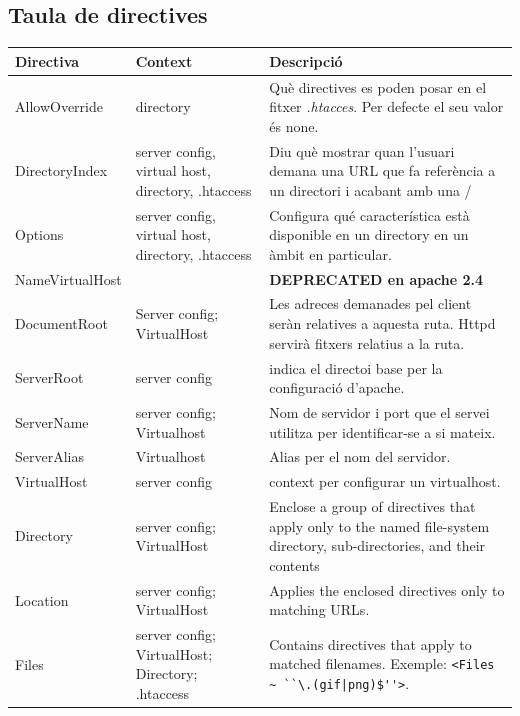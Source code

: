 \documentclass[a4paper, 11pt]{article}
\begin{document}
\subsection{Taula de directives}
\begin{tabular}{|p{4cm}|p{3cm}|p{5cm}|}
\hline
\textbf{Directiva} & \textbf{Context} & \textbf{Descripció} \\
\hline
AllowOverride & directory & Què directives es poden posar en el fitxer \textit{.htacces}. Per defecte el seu valor \'es none.\\
\hline
DirectoryIndex & server config, virtual host, directory, .htaccess & Diu què mostrar quan l'usuari demana una URL que fa referència a un directori i acabant amb una \slash\\
\hline
Options & server config, virtual host, directory, .htaccess & Configura qu\'e característica està disponible en un directory en un àmbit en particular.\\
\hline
NameVirtualHost & & \textbf{DEPRECATED en apache 2.4}\\
\hline
DocumentRoot & Server config; VirtualHost& Les adreces demanades pel client seràn relatives a aquesta ruta. Httpd servirà fitxers relatius a la ruta.\\
\hline
ServerRoot & server config& indica el directoi base per la configuració d'apache.\\
\hline
ServerName & server config; Virtualhost& Nom de servidor i port que el servei utilitza per identificar-se a si mateix.\\
\hline
ServerAlias & Virtualhost& Alias per el nom del servidor.\\
\hline
VirtualHost & server config & context per configurar un virtualhost.\\
\hline
Directory & server config; VirtualHost& Enclose a group of directives that apply only to the named file-system directory, sub-directories, and their contents\\
\hline
Location & server config; VirtualHost& Applies the enclosed directives only to matching URLs.\\
\hline
Files & server config; VirtualHost; Directory; .htaccess& Contains directives that apply to matched filenames. 
Exemple: 
\footnotesize{\verb+<Files ~ ``\.(gif|png)$''>+}.\\
\hline
\end{tabular}
\end{document}

